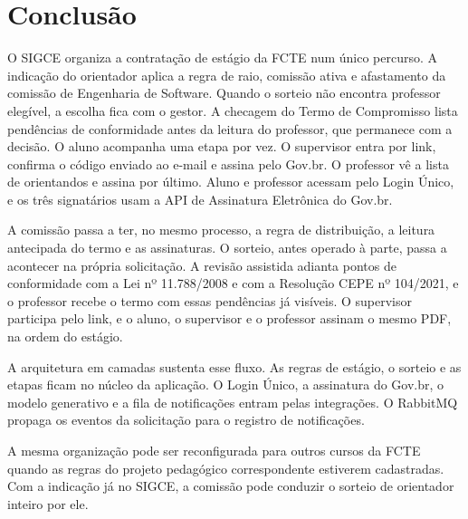 \chapter{Conclusão}

O SIGCE organiza a contratação de estágio da FCTE num único percurso. A indicação do orientador aplica a regra de raio, comissão ativa e afastamento da comissão de Engenharia de Software. Quando o sorteio não encontra professor elegível, a escolha fica com o gestor. A checagem do Termo de Compromisso lista pendências de conformidade antes da leitura do professor, que permanece com a decisão. O aluno acompanha uma etapa por vez. O supervisor entra por link, confirma o código enviado ao e-mail e assina pelo Gov.br. O professor vê a lista de orientandos e assina por último. Aluno e professor acessam pelo Login Único, e os três signatários usam a API de Assinatura Eletrônica do Gov.br.

A comissão passa a ter, no mesmo processo, a regra de distribuição, a leitura antecipada do termo e as assinaturas. O sorteio, antes operado à parte, passa a acontecer na própria solicitação. A revisão assistida adianta pontos de conformidade com a Lei nº 11.788/2008 e com a Resolução CEPE nº 104/2021, e o professor recebe o termo com essas pendências já visíveis. O supervisor participa pelo link, e o aluno, o supervisor e o professor assinam o mesmo PDF, na ordem do estágio.

A arquitetura em camadas sustenta esse fluxo. As regras de estágio, o sorteio e as etapas ficam no núcleo da aplicação. O Login Único, a assinatura do Gov.br, o modelo generativo e a fila de notificações entram pelas integrações. O RabbitMQ propaga os eventos da solicitação para o registro de notificações.

A mesma organização pode ser reconfigurada para outros cursos da FCTE quando as regras do projeto pedagógico correspondente estiverem cadastradas. Com a indicação já no SIGCE, a comissão pode conduzir o sorteio de orientador inteiro por ele.
